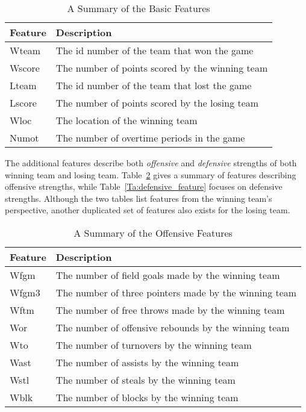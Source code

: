 \begin{table}[h!]
\centering
\begin{tabular}{ | l | l | }
\hline
\textbf{Feature} & \textbf{Description} \\ \hline
Wteam & The id number of the team that won the game \\ \hline
Wscore & The number of points scored by the winning team \\ \hline
Lteam & The id number of the team that lost the game \\ \hline
Lscore & The number of points scored by the losing team \\ \hline
Wloc & The location of the winning team \\ \hline
Numot & The number of overtime periods in the game \\ \hline
\end{tabular}
\caption{A Summary of the Basic Features}\label{Ta:basic_feature}
\end{table}

The additional features describe both \emph{offensive} and \emph{defensive} strengths of both winning team and losing team. Table~\ref{Ta:offensive_feature} gives a summary of features describing offensive strengths, while Table~\ref{Ta:defensive_feature} focuses on defensive strengths. Although the two tables list features from the winning team's perspective, another duplicated set of features also exists for the losing team. 

\begin{table}[h!]
\centering
\begin{tabular}{ | l | l | }
\hline
\textbf{Feature} & \textbf{Description} \\ \hline
Wfgm & The number of field goals made by the winning team\\ \hline
Wfgm3 & The number of three pointers made by the winning team \\ \hline
Wftm & The number of free throws made by the winning team \\ \hline
Wor & The number of offensive rebounds by the winning team \\ \hline
Wto & The number of turnovers by the winning team\\ \hline
Wast & The number of assists by the winning team \\ \hline
Wstl & The number of steals by the winning team \\ \hline
Wblk & The number of blocks by the winning team \\ \hline
\end{tabular}
\caption{A Summary of the Offensive Features}\label{Ta:offensive_feature}
\end{table}

